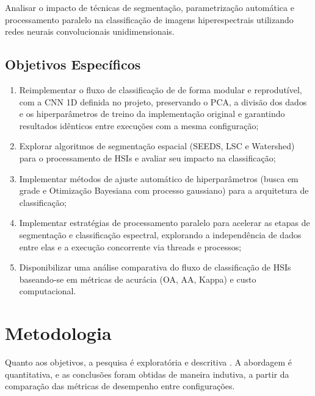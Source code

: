 Analisar o impacto de técnicas de segmentação, parametrização automática e processamento paralelo na classificação de imagens hiperespectrais utilizando redes neurais convolucionais unidimensionais.

\bigskip
\subsection{Objetivos Específicos}

\begin{enumerate}
    \item Reimplementar o fluxo de classificação de  de forma modular e reprodutível, com a CNN 1D definida no projeto, preservando o PCA, a divisão dos dados e os hiperparâmetros de treino da implementação original e garantindo resultados idênticos entre execuções com a mesma configuração;

    \item Explorar algoritmos de segmentação espacial (SEEDS, LSC e Watershed) para o processamento de HSIs e avaliar seu impacto na classificação;

    \item Implementar métodos de ajuste automático de hiperparâmetros (busca em grade e Otimização Bayesiana com processo gaussiano) para a arquitetura de classificação;

    \item Implementar estratégias de processamento paralelo para acelerar as etapas de segmentação e classificação espectral, explorando a independência de dados entre elas e a execução concorrente via threads e processos;

    \item Disponibilizar uma análise comparativa do fluxo de classificação de HSIs baseando-se em métricas de acurácia (OA, AA, Kappa) e custo computacional.
\end{enumerate}

\section{Metodologia}

Quanto aos objetivos, a pesquisa é exploratória e descritiva \cite{Gil2002}. A abordagem é quantitativa, e as conclusões foram obtidas de maneira indutiva, a partir da comparação das métricas de desempenho entre configurações.

